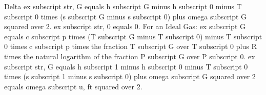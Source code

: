 Delta ex subscript str, G equals h subscript G minus h subscript 0 minus T subscript 0 times (s subscript G minus s subscript 0) plus omega subscript G squared over 2. 
ex subscript str, 0 equals 0.
For an Ideal Gas: ex subscript G equals c subscript p times (T subscript G minus T subscript 0) minus T subscript 0 times c subscript p times the fraction T subscript G over T subscript 0 plus R times the natural logarithm of the fraction P subscript G over P subscript 0.
ex subscript str, G equals h subscript 1 minus h subscript 0 minus T subscript 0 times (s subscript 1 minus s subscript 0) plus omega subscript G squared over 2 equals omega subscript u, ft squared over 2.